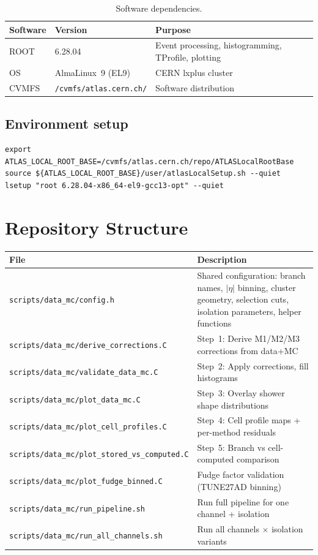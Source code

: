 \documentclass[12pt,a4paper]{article}
\begin{document}
\begin{table}[htbp]
\centering
\caption{Software dependencies.}
\label{tab:requirements}
\begin{tabular}{llp{8cm}}
\toprule
\textbf{Software} & \textbf{Version} & \textbf{Purpose} \\
\midrule
ROOT & 6.28.04 & Event processing, histogramming, TProfile, plotting \\
OS   & AlmaLinux~9 (EL9) & CERN lxplus cluster \\
CVMFS & \texttt{/cvmfs/atlas.cern.ch/} & Software distribution \\
\bottomrule
\end{tabular}
\end{table}

\subsection{Environment setup}

\begin{lstlisting}
export ATLAS_LOCAL_ROOT_BASE=/cvmfs/atlas.cern.ch/repo/ATLASLocalRootBase
source ${ATLAS_LOCAL_ROOT_BASE}/user/atlasLocalSetup.sh --quiet
lsetup "root 6.28.04-x86_64-el9-gcc13-opt" --quiet
\end{lstlisting}

\section{Repository Structure}
\label{sec:structure}

\begin{longtable}{p{5.5cm}p{9cm}}
\toprule
\textbf{File} & \textbf{Description} \\
\midrule
\endhead
\texttt{scripts/data\_mc/config.h} & Shared configuration: branch names, $|\eta|$ binning, cluster geometry, selection cuts, isolation parameters, helper functions \\
\texttt{scripts/data\_mc/derive\_corrections.C} & Step~1: Derive M1/M2/M3 corrections from data+MC \\
\texttt{scripts/data\_mc/validate\_data\_mc.C} & Step~2: Apply corrections, fill histograms \\
\texttt{scripts/data\_mc/plot\_data\_mc.C} & Step~3: Overlay shower shape distributions \\
\texttt{scripts/data\_mc/plot\_cell\_profiles.C} & Step~4: Cell profile maps + per-method residuals \\
\texttt{scripts/data\_mc/plot\_stored\_vs\_computed.C} & Step~5: Branch vs cell-computed comparison \\
\texttt{scripts/data\_mc/plot\_fudge\_binned.C} & Fudge factor validation (TUNE27AD binning) \\
\texttt{scripts/data\_mc/run\_pipeline.sh} & Run full pipeline for one channel + isolation \\
\texttt{scripts/data\_mc/run\_all\_channels.sh} & Run all channels $\times$ isolation variants \\
\bottomrule
\end{longtable}
\end{document}
